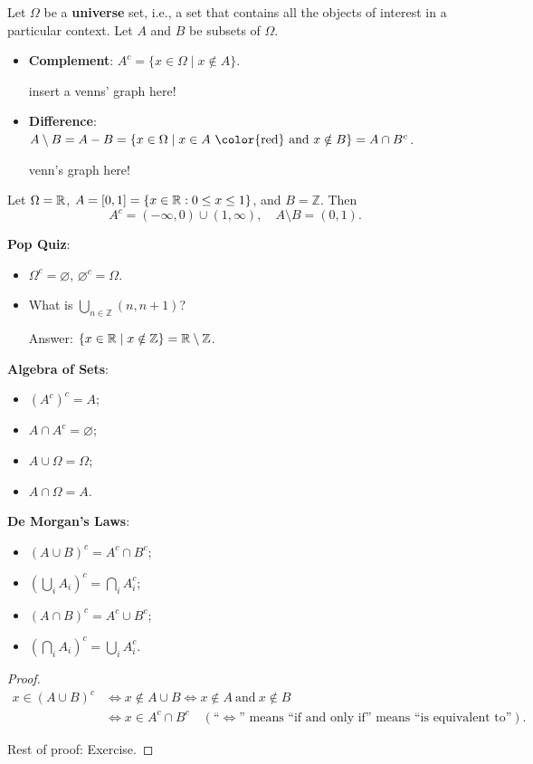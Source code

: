   
  \begin{definition}
    Let $\Omega$ be a \textbf{universe} set, i.e., a set that contains all the
    objects of interest in a particular context. Let $A$ and $B$ be subsets of $\Omega$.
    \begin{itemize}
    \item \textbf{Complement}: $A^c = \{x\in \Omega\mid x\notin A\}$.
    
    {\color{red} insert a venns' graph here!}
    \item \textbf{Difference}: $A\setminus B =  A - B = \{x\in\Omega\mid x\in A
    ~\text{\color{red} and}~x\notin B \} = A\cap B^c$.
    
    {\color{red} venn's graph here!} 
    \end{itemize}
  \end{definition}

  \begin{example}
    Let $\Omega = \mathbb{R}$, $A = [0,1] = \{x\in \mathbb{R}: 0\le x\le 1\}$, and $B =
    \mathbb{Z}$. Then
    \[
      A^c = (-\infty, 0)\cup (1,\infty),\quad A\setminus B = (0,1).
    \]
  \end{example}

  \textbf{Pop Quiz}: 
  \begin{itemize}
  \item $\Omega^c = \varnothing$, $\varnothing^c = \Omega$.
  \item What is $\bigcup_{n\in \mathbb{Z}} (n,n+1)$?

  Answer: $\{x\in \mathbb{R}\mid x\notin \mathbb{Z}\} = \mathbb{R} \setminus \mathbb{Z}$.
  \end{itemize}

  \textbf{Algebra of Sets}:
  \begin{itemize}
  \item $(A^c)^c = A$;
  \item $A\cap A^c = \varnothing$;
  \item $A\cup \Omega = \Omega$;
  \item $A\cap \Omega = A$.
  \end{itemize}

  \textbf{De Morgan's Laws}:
  \begin{itemize}
  \item $(A\cup B)^c = A^c \cap B^c$;
  \item $\left( \bigcup_i A_i \right)^c = \bigcap_i A_i^c$;
  \item $(A\cap B)^c = A^c \cup B^c$;
  \item $\left( \bigcap_i A_i  \right)^c = \bigcup_i A_i^c$.
  \end{itemize}
  \begin{proof}
    \begin{align*}
      x\in (A\cup B)^c & \Leftrightarrow x\notin A\cup B \Leftrightarrow x\notin A~\text{and}~x\notin B\\
                       & \Leftrightarrow x\in A^c \cap B^c \quad (\text{``$\Leftrightarrow$'' means ``if and only if'' means ``is equivalent to''}).
    \end{align*}

    Rest of proof: Exercise.
  \end{proof}

